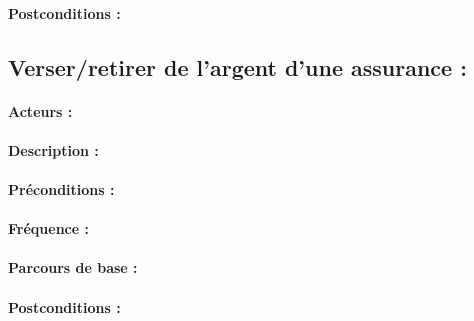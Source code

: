 \documentclass[../annexe.tex]{subfiles}
\begin{document}
\paragraph{Postconditions :}

\newpage

\subsection{Verser/retirer de l'argent d'une assurance :}

\paragraph{Acteurs :}

\paragraph{Description :}

\paragraph{Préconditions :}

\paragraph{Fréquence :}

\paragraph{Parcours de base :}

\paragraph{Postconditions :}
\end{document}
